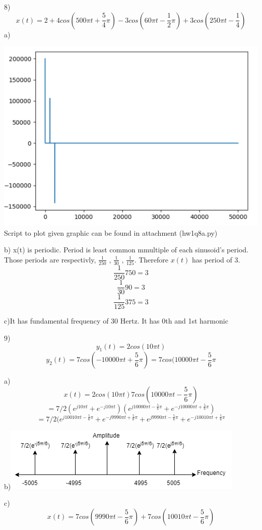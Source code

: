 \documentclass{article}
\begin{document}
	8)
	$$x(t)=2+4cos(500\pi t+\frac{5}{4}\pi)-3cos(60\pi t -\frac{1}{2}\pi ) + 3cos(250\pi t - \frac{1}{4})$$
	a)\par
	\includegraphics[scale=0.8]{q8a}
	Script to plot given graphic can be found in attachment (hw1q8a.py)
	\par
	b)
	x(t) is periodic. Period is least common mmultiple of each sinusoid's period. Those periods are respectivly, $\frac{1}{250}$ , $\frac{1}{30}$ , $\frac{1}{125}$. Therefore $x(t)$ has period of $3$. 
	$$\frac{1}{250}750=3$$
	$$\frac{1}{30}90=3$$
	$$\frac{1}{125}375=3$$
	\par
	c)It has fundamental frequency of $30$ Hertz. It has 0th and 1st harmonic 
	\par
	
	9)
	$$y_1(t)=2cos(10\pi t)$$
	$$y_2(t)=7cos(-10000 \pi t +\frac{5}{6} \pi)=7cos(10000 \pi t -\frac{5}{6} \pi$$
	\par
	a)
	$$x(t)=2cos(10\pi t)7cos(10000 \pi t -\frac{5}{6} \pi)$$
	$$=7/2(e^{j10\pi t}+e^{-j10\pi t})(e^{j 10000 \pi t -\frac{5}{6} \pi }+ e^{-j 10000 \pi t +\frac{5}{6} \pi})$$
	$$=7/2(e^{j10010\pi t -\frac{5}{6} \pi}+e^{-j 9990 \pi t + \frac{5}{6} \pi} +
	e^{j 9990 \pi t - \frac{5}{6} \pi}+e^{-j10010\pi t +\frac{5}{6} \pi}$$
	\par
	b)\includegraphics[scale=0.8]{q9b}
	\par
	c)
	$$x(t)=7cos(9990 \pi t - \frac{5}{6} \pi)+7cos(10010\pi t -\frac{5}{6}\pi)$$
	\par
	
\end{document}
